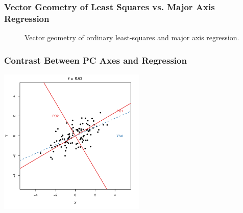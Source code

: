 \documentclass{beamer}
\begin{document}
\begin{frame}
  \frametitle{Vector Geometry of Least Squares vs. Major Axis Regression}

\begin{figure}
\begin{center}
\end{center}
\caption{Vector geometry of ordinary least-squares and major axis regression.}
\end{figure}

\end{frame}









\begin{frame}
  \frametitle{Contrast Between PC Axes and Regression}

\begin{center}
\includegraphics[height=2.75in]{fig-bivariate-pca-wreg.pdf}
\smallskip

\end{center}  

\end{frame}
\end{document}
